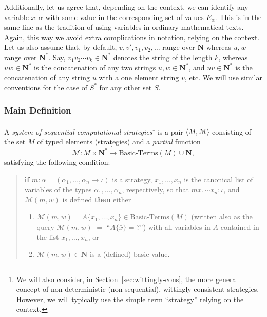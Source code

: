 \documentclass[fleqn]{LMCS}
\theoremstyle{plain}\newtheorem{satz}[thm]{Satz}
\theoremstyle{plain}\newtheorem{hyp}[thm]{Hypothesis}
\theoremstyle{plain}\newtheorem{hyps}[thm]{Hypotheses}
\theoremstyle{definition}\newtheorem{note}[thm]{Note}
\newcommand{\arr}{\rightarrow}
\newcommand{\la}{\langle}
\newcommand{\ra}{\rangle}
\newcommand{\tuple}[1]{\la #1 \ra}
\newcommand{\NN}{\mathbf{N}}
\newcommand{\Basictype}{\iota}
\newcommand{\MM}{{\mathcal M}}
\newcommand{\bx}{\bar{x}}
\newcommand{\?}{\mbox{?}}
\begin{document}
Additionally, let us agree that, depending on the context, 
we can identify any variable $x:\alpha$ with some 
value in the corresponding set of values $E_{\alpha}$. 
This is in the same line as the tradition of using variables in 
ordinary mathematical texts. Again, this way we avoid 
extra complications in notation, relying on the context. 
Let us also assume that, by default, 
$v,v',v_1,v_2,\ldots$ range over $\NN$ 
whereas $u,w$ range over $\NN^{\ast}$.
Say, $v_1 v_2\cdots v_k\in\NN^{\ast}$ denotes the string 
of the length $k$, whereas $uw\in\NN^{\ast}$ is the concatenation 
of any two strings $u,w\in\NN^{\ast}$, and $uv\in\NN^{\ast}$ 
is the concatenation of any string $u$ with a one element string 
$v$, etc. We will use similar conventions for the case of 
$S^{\ast}$ for any other set $S$. 

\subsubsection{Main Definition}
\label{sec-seq-stra-def-main}
\begin{defi}\label{def:strategies}A {\em system of sequential computational strategies\/}\footnote{We will also consider, in Section~\ref{sec:wittingly-cons}, 
the more general concept of non-deterministic (non-sequential), 
wittingly consistent strategies. 
However, we will typically use the simple term ``strategy'' 
relying on the context. 
} 
is a pair $\tuple{M,\MM}$ consisting of 
the set $M$ of typed elements (strategies) 
and a {\em partial\/} 
function
\[
\MM:M \times \NN^\ast \mathrel{\dot{\arr}} \mbox{Basic-Terms}(M) \cup \NN,
\]
satisfying the following condition:
\begin{quote}
{\bf if} $m:\alpha = (\alpha_1,\ldots, \alpha_n \arr \Basictype)$ is a strategy, 
$x_1,\ldots, x_n$ is the canonical list of variables
of the types $\alpha_1,\ldots,\alpha_n$, respectively, so that
$mx_1\cdots x_n : \Basictype$, 
and $\MM(m,w)$ is defined {\bf then} either
\begin{enumerate}[(1)]
\item\label{item:strategies:variables}

$\MM(m,w) = A\{x_1,\ldots, x_n\}\in 
\mbox{Basic-Terms}(M)$ (written also as the query $\MM(m,w)$ $=$ ``$A\{\bx\}=\?$'') 
with all variables in $A$ contained in the list $x_1,\ldots, x_n$, or
\item
$\MM(m,w)\in \NN$ is a (defined) basic value. 
\end{enumerate}
\end{quote}
\end{defi}
\end{document}
